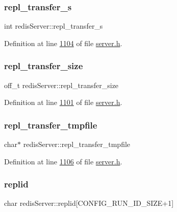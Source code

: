 \subsubsection{\texorpdfstring{repl\+\_\+transfer\+\_\+s}{repl\_transfer\_s}}
{\footnotesize\ttfamily int redis\+Server\+::repl\+\_\+transfer\+\_\+s}



Definition at line \hyperlink{server_8h_source_l01104}{1104} of file \hyperlink{server_8h_source}{server.\+h}.

\mbox{\label{structredisServer_a216ee135a8a22d37406dd95c79149be7}} 
\subsubsection{\texorpdfstring{repl\+\_\+transfer\+\_\+size}{repl\_transfer\_size}}
{\footnotesize\ttfamily off\+\_\+t redis\+Server\+::repl\+\_\+transfer\+\_\+size}



Definition at line \hyperlink{server_8h_source_l01101}{1101} of file \hyperlink{server_8h_source}{server.\+h}.

\mbox{\label{structredisServer_afafdd87eab1e9531eb8b52a26b130a4f}} 
\subsubsection{\texorpdfstring{repl\+\_\+transfer\+\_\+tmpfile}{repl\_transfer\_tmpfile}}
{\footnotesize\ttfamily char$\ast$ redis\+Server\+::repl\+\_\+transfer\+\_\+tmpfile}



Definition at line \hyperlink{server_8h_source_l01106}{1106} of file \hyperlink{server_8h_source}{server.\+h}.

\mbox{\label{structredisServer_a8b8d9b773bafd62ce14e81b5f96c6c6c}} 
\subsubsection{\texorpdfstring{replid}{replid}}
{\footnotesize\ttfamily char redis\+Server\+::replid\mbox{[}C\+O\+N\+F\+I\+G\+\_\+\+R\+U\+N\+\_\+\+I\+D\+\_\+\+S\+I\+ZE+1\mbox{]}}



